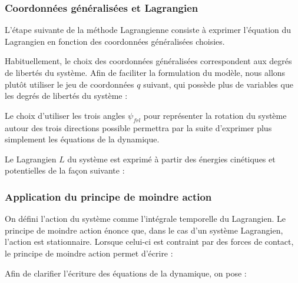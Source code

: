 			
			\subsubsection{Coordonnées généralisées et Lagrangien}
			
				L'étape suivante de la méthode Lagrangienne consiste à exprimer l'équation du Lagrangien en fonction des coordonnées généralisées choisies.
				
				Habituellement, le choix des coordonnées généralisées correspondent aux degrés de libertés du système. 
				Afin de faciliter la formulation du modèle, nous allons plutôt utiliser le jeu de coordonnées $q$ suivant, qui possède plus de variables que les degrés de libertés du système :
								
				Le choix d'utiliser les trois angles $\psi_{frl}$ pour représenter la rotation du système autour des trois directions possible permettra par la suite d'exprimer plus simplement les équations de la dynamique.
				
				
				Le Lagrangien $L$ du système est exprimé à partir des énergies cinétiques et potentielles de la façon suivante :
				
			\subsubsection{Application du principe de moindre action}	
			
				
					On défini l'action du système comme l'intégrale temporelle du Lagrangien. 
					Le principe de moindre action énonce que, dans le cas d'un système Lagrangien, l'action est stationnaire.
					Lorsque celui-ci est contraint par des forces de contact, le principe de moindre action permet d'écrire :
					
					Afin de clarifier l'écriture des équations de la dynamique, on pose :
				
